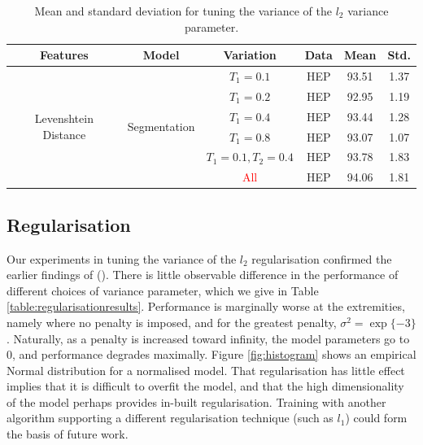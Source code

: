 \begin{table}[h]
\begin{center}
\begin{tabular}{|c|c|c|c|c|c|}
\hline
Features & Model & Variation & Data & Mean & Std.\\
\hline
\multirow{6}{*}{Levenshtein Distance} & \multirow{6}{*}{Segmentation} & $T_1 = 0.1$ & HEP & 93.51 & 1.37\\\cline{3-6}
& & $T_1 = 0.2$ & HEP & 92.95 & 1.19\\\cline{3-6}
& & $T_1 = 0.4$ & HEP & 93.44 & 1.28\\\cline{3-6}
& & $T_1 = 0.8$ & HEP & 93.07 & 1.07\\\cline{3-6}
& & $T_1 = 0.1, T_2 = 0.4$ & HEP & 93.78 & 1.83\\\cline{3-6}
& & \textcolor{red}{All} & HEP & 94.06 & 1.81\\\cline{3-6}
\hline
\end{tabular}
\caption[Mean and standard deviation for tuning the variance of the $l_2$ variance parameter.]{Mean and standard deviation for tuning the variance of the $l_2$ variance parameter.}
\label{table:levenshteinresults}
\end{center}
\end{table}

\subsection{Regularisation}

Our experiments in tuning the variance of the $l_2$ regularisation confirmed the earlier findings of (\cite{Peng04accurateinformation}). There is little observable difference in the performance of different choices of variance parameter, which we give in Table \ref{table:regularisationresults}. Performance is marginally worse at the extremities, namely where no penalty is imposed, and for the greatest penalty, $\sigma^2 = \exp\{-3\}$. Naturally, as a penalty is increased toward infinity, the model parameters go to 0, and performance degrades maximally. Figure \ref{fig:histogram} shows an empirical Normal distribution for a normalised model. That regularisation has little effect implies that it is difficult to overfit the model, and that the high dimensionality of the model perhaps provides in-built regularisation. Training with another algorithm supporting a different regularisation technique (such as $l_1$) could form the basis of future work.

